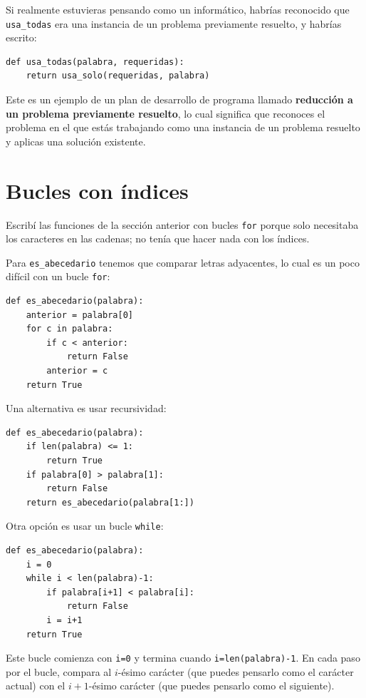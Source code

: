 \documentclass[10pt]{book}
\begin{document}
Si realmente estuvieras pensando como un informático,
habrías reconocido que \verb"usa_todas" era una instancia de un
problema previamente resuelto, y habrías escrito:

\begin{verbatim}
def usa_todas(palabra, requeridas):
    return usa_solo(requeridas, palabra)
\end{verbatim}
%
Este es un ejemplo de un plan de desarrollo de programa llamado {\bf
  reducción a un problema previamente resuelto}, lo cual significa que
reconoces el problema en el que estás trabajando como una instancia de un
problema resuelto y aplicas una solución existente.
 


\section{Bucles con índices}

Escribí las funciones de la sección anterior con bucles {\tt for}
porque solo necesitaba los caracteres en las cadenas; no
tenía que hacer nada con los índices.

Para \verb"es_abecedario" tenemos que comparar letras adyacentes,
lo cual es un poco difícil con un bucle {\tt for}:

\begin{verbatim}
def es_abecedario(palabra):
    anterior = palabra[0]
    for c in palabra:
        if c < anterior:
            return False
        anterior = c
    return True
\end{verbatim}

Una alternativa es usar recursividad:

\begin{verbatim}
def es_abecedario(palabra):
    if len(palabra) <= 1:
        return True
    if palabra[0] > palabra[1]:
        return False
    return es_abecedario(palabra[1:])
\end{verbatim}

Otra opción es usar un bucle {\tt while}:

\begin{verbatim}
def es_abecedario(palabra):
    i = 0
    while i < len(palabra)-1:
        if palabra[i+1] < palabra[i]:
            return False
        i = i+1
    return True
\end{verbatim}
%
Este bucle comienza con {\tt i=0} y termina cuando {\tt i=len(palabra)-1}.  En cada
paso por el bucle, compara al $i$-ésimo carácter (que puedes
pensarlo como el carácter actual) con el $i+1$-ésimo carácter (que puedes
pensarlo como el siguiente).
\end{document}
